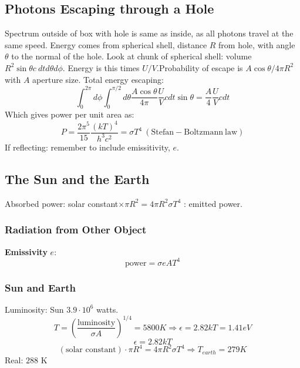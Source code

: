 \documentclass[a4paper,norsk, 10pt]{article}
\begin{document}
\subsection{Photons Escaping through a Hole}
Spectrum outside of box with hole is same as inside, as all photons travel at the same speed. Energy comes from spherical shell, distance $R$ from hole, with angle $\theta$ to the normal of the hole. Look at chunk of spherical shell: volume $R^2 \sin \theta c\ dt d\theta d\phi$. Energy is this times $U/V$.Probability of escape is $A\cos \theta/4\pi R^2$ with $A$ aperture size. Total energy escaping:
\begin{equation}
\int_0^{2\pi}d\phi \int_0^{\pi/2} d\theta \frac{A\cos \theta}{4\pi}\frac{U}{V}cdt\sin \theta = \frac{A}{4}\frac{U}{V}cdt
\end{equation}
Which gives power per unit area as:
\begin{equation}
P=\frac{2\pi^5}{15}\frac{\left(kT\right)^4}{h^3c^2}=\sigma T^4 \ \mathrm{(Stefan-Boltzmann\ law)}
\end{equation}
If reflecting: remember to include emissitivity, $e$.
\subsection{The Sun and the Earth}
Absorbed power: solar constant$\times \pi R^2= 4\pi R^2\sigma T^4$ : emitted power.
\subsubsection{Radiation from Other Object}
\textbf{Emissivity} $e$:
\begin{equation}
\text{power} = \sigma e A T^4
\end{equation}
\subsubsection{Sun and Earth}
Luminosity: Sun $3.9\cdot 10^{6}$ watts.
\begin{equation}
T = \left(\frac{\text{luminosity}}{\sigma A}\right)^{1/4} = 5800 K \Rightarrow\epsilon = 2.82kT = 1.41 eV
\end{equation}
\begin{equation}
\epsilon = 2.82kT
\end{equation}
\begin{equation}
(\text{solar constant}) \cdot \pi R^4 = 4\pi R^2 \sigma T^4 \Rightarrow T_{earth} = 279 K
\end{equation}
Real: $288$ K
\end{document}
